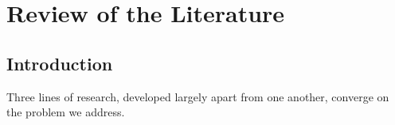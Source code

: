 %
%
%

\chapter{Review of the Literature}
\label{ch:literature}

\section{Introduction}
\label{sec:lit_history}

Three lines of research, developed largely apart from one another, converge on
the problem we address.

